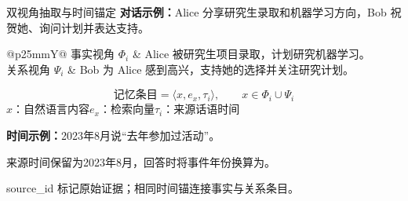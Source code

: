 \begin{frame}{双视角抽取与时间锚定}
\small
\textbf{对话示例：}Alice 分享研究生录取和机器学习方向，Bob 祝贺她、询问计划并表达支持。\par
\vspace{3mm}
\begin{tabularx}{\linewidth}{@{}p{25mm}Y@{}}
\toprule
事实视角 $\Phi_i$ & Alice 被研究生项目录取，计划研究机器学习。\\[1mm]
关系视角 $\Psi_i$ & Bob 为 Alice 感到高兴，支持她的选择并关注研究计划。\\\bottomrule
\end{tabularx}\par
\vspace{2mm}
\[
  \text{记忆条目}=\langle x, e_x, \tau_i\rangle,
  \qquad x\in\Phi_i\cup\Psi_i
\]
$x$：自然语言内容\quad $e_x$：检索向量\quad $\tau_i$：来源话语时间\par
\vspace{3mm}
\textbf{时间示例：}2023年8月说“去年参加过活动”。\par\vspace{1mm}
来源时间保留为2023年8月，回答时将事件年份换算为。\par
\par\vspace{3mm}source\_id 标记原始证据；相同时间锚连接事实与关系条目。\par
{}
\end{frame}

